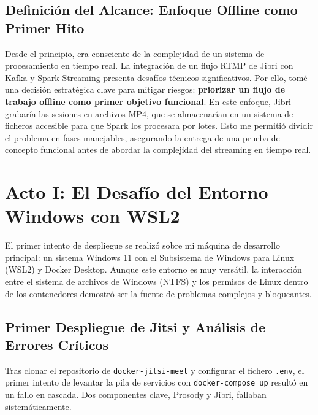 \subsection{Definición del Alcance: Enfoque Offline como Primer Hito}
Desde el principio, era consciente de la complejidad de un sistema de procesamiento en tiempo real. La integración de un flujo RTMP de Jibri con Kafka y Spark Streaming presenta desafíos técnicos significativos. Por ello, tomé una decisión estratégica clave para mitigar riesgos: \textbf{priorizar un flujo de trabajo offline como primer objetivo funcional}. En este enfoque, Jibri grabaría las sesiones en archivos MP4, que se almacenarían en un sistema de ficheros accesible para que Spark los procesara por lotes. Esto me permitió dividir el problema en fases manejables, asegurando la entrega de una prueba de concepto funcional antes de abordar la complejidad del streaming en tiempo real.

\section{Acto I: El Desafío del Entorno Windows con WSL2}
\label{sec:desarrollo_acto1}
El primer intento de despliegue se realizó sobre mi máquina de desarrollo principal: un sistema Windows 11 con el Subsistema de Windows para Linux (WSL2) y Docker Desktop. Aunque este entorno es muy versátil, la interacción entre el sistema de archivos de Windows (NTFS) y los permisos de Linux dentro de los contenedores demostró ser la fuente de problemas complejos y bloqueantes.

\subsection{Primer Despliegue de Jitsi y Análisis de Errores Críticos}
Tras clonar el repositorio de \texttt{docker-jitsi-meet} y configurar el fichero \texttt{.env}, el primer intento de levantar la pila de servicios con \texttt{docker-compose up} resultó en un fallo en cascada. Dos componentes clave, Prosody y Jibri, fallaban sistemáticamente.

